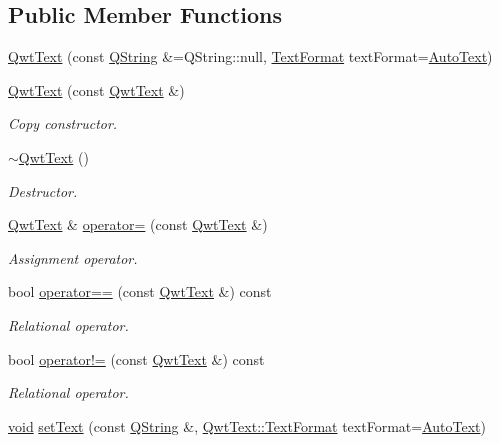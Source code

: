 \subsection*{Public Member Functions}
\begin{DoxyCompactItemize}
\item 
\hyperlink{class_qwt_text_a91439964ad1150c136dcaa113a648ecf}{Qwt\-Text} (const \hyperlink{group___u_a_v_objects_plugin_gab9d252f49c333c94a72f97ce3105a32d}{Q\-String} \&=Q\-String\-::null, \hyperlink{class_qwt_text_a63e0d6a59a427a37ed0bfa71b782fd76}{Text\-Format} text\-Format=\hyperlink{class_qwt_text_a63e0d6a59a427a37ed0bfa71b782fd76a0645d333081ec9e3574c98f510c284a1}{Auto\-Text})
\item 
\hyperlink{class_qwt_text_af88b42733c420574fa76b2d58b965313}{Qwt\-Text} (const \hyperlink{class_qwt_text}{Qwt\-Text} \&)
\begin{DoxyCompactList}\small\item\em Copy constructor. \end{DoxyCompactList}\item 
\hyperlink{class_qwt_text_aba243ac11b91979ad3f2ee7d3c700195}{$\sim$\-Qwt\-Text} ()
\begin{DoxyCompactList}\small\item\em Destructor. \end{DoxyCompactList}\item 
\hyperlink{class_qwt_text}{Qwt\-Text} \& \hyperlink{class_qwt_text_ad4a8678071c7e114c47a21f1f78cca37}{operator=} (const \hyperlink{class_qwt_text}{Qwt\-Text} \&)
\begin{DoxyCompactList}\small\item\em Assignment operator. \end{DoxyCompactList}\item 
bool \hyperlink{class_qwt_text_a0a7fba648ad898d751de60e9a6d7802f}{operator==} (const \hyperlink{class_qwt_text}{Qwt\-Text} \&) const 
\begin{DoxyCompactList}\small\item\em Relational operator. \end{DoxyCompactList}\item 
bool \hyperlink{class_qwt_text_a092326f250d2b865ad93f16462d9fc9f}{operator!=} (const \hyperlink{class_qwt_text}{Qwt\-Text} \&) const 
\begin{DoxyCompactList}\small\item\em Relational operator. \end{DoxyCompactList}\item 
\hyperlink{group___u_a_v_objects_plugin_ga444cf2ff3f0ecbe028adce838d373f5c}{void} \hyperlink{class_qwt_text_a9ba9caa82fcfbc4bfbf8ce20ccea981e}{set\-Text} (const \hyperlink{group___u_a_v_objects_plugin_gab9d252f49c333c94a72f97ce3105a32d}{Q\-String} \&, \hyperlink{class_qwt_text_a63e0d6a59a427a37ed0bfa71b782fd76}{Qwt\-Text\-::\-Text\-Format} text\-Format=\hyperlink{class_qwt_text_a63e0d6a59a427a37ed0bfa71b782fd76a0645d333081ec9e3574c98f510c284a1}{Auto\-Text})

\end{DoxyCompactItemize}
